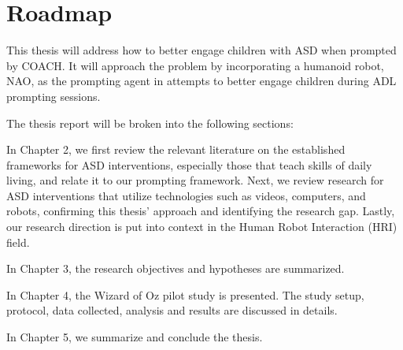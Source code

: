 \section{Roadmap}

This thesis will address how to better engage children with ASD when prompted by COACH.  It will approach the problem by incorporating a humanoid robot, NAO, as the prompting agent in attempts to better engage children during ADL prompting sessions.


The thesis report will be broken into the following sections:


In Chapter 2, we first review the relevant literature on the established frameworks for ASD interventions, especially those that teach skills of daily living, and relate it to our prompting framework.  Next, we review research for ASD interventions that utilize technologies such as videos, computers, and robots, confirming this thesis' approach and identifying the research gap.  Lastly, our research direction is put into context in the Human Robot Interaction (HRI) field.


In Chapter 3, the research objectives and hypotheses are summarized.

In Chapter 4, the Wizard of Oz pilot study is presented.  The study setup, protocol, data collected, analysis and results are discussed in details.

In Chapter 5, we summarize and conclude the thesis.


